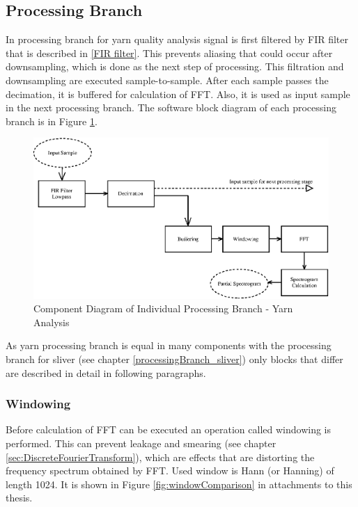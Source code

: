 \documentclass[twoside]{ctuthesis}
\theoremstyle{plain}
\theoremstyle{definition}
\theoremstyle{note}
\begin{document}
\subsection{Processing Branch}
In processing branch for yarn quality analysis signal is first filtered by FIR filter that is described in \ref{FIR filter}. This prevents aliasing that could occur after downsampling, which is done as the next step of processing. This filtration and downsampling are executed sample-to-sample. After each sample passes the decimation, it is buffered for calculation of FFT. Also, it is used as input sample in the next processing branch. The software block diagram of each processing branch is in Figure \ref{fig:singleBranch_yarn}.
\begin{figure}[h]
	\centering
	\includegraphics[width=1.0\textwidth]{yarn_singleBranch.eps}
	\caption{Component Diagram of Individual Processing Branch - Yarn Analysis}
	\label{fig:singleBranch_yarn}
\end{figure}

As yarn processing branch is equal in many components with the processing branch for sliver (see chapter \ref{processingBranch_sliver}) only blocks that differ are described in detail in following paragraphs.

\subsubsection{Windowing}
Before calculation of FFT can be executed an operation called windowing is performed. This can prevent leakage and smearing (see chapter \ref{sec:DiscreteFourierTransform}), which are effects that are distorting the frequency spectrum obtained by FFT. Used window is Hann (or Hanning) of length 1024. It is shown in Figure \ref{fig:windowComparison} in attachments to this thesis.
\end{document}
